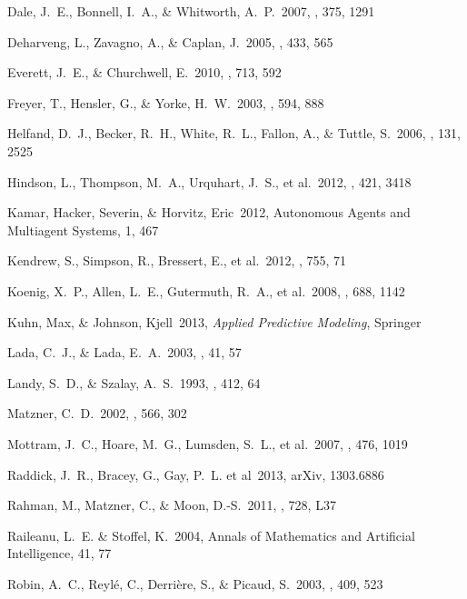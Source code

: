 \begin{thebibliography}{16}
 Dale, J.~E., Bonnell,
I.~A., \& Whitworth, A.~P.\ 2007, \mnras, 375, 1291

 Deharveng, L., Zavagno, A., \& Caplan, J.\ 2005, \aap, 433, 565

 Everett, J.~E., \& Churchwell, E.\ 2010, \apj, 713, 592

 Freyer, T., Hensler, G.,
\& Yorke, H.~W.\ 2003, \apj, 594, 888

 Helfand, D.~J., Becker,
R.~H., White, R.~L., Fallon, A., \& Tuttle, S.\ 2006, \aj, 131, 2525

 Hindson, L., Thompson,
M.~A., Urquhart, J.~S., et al.\ 2012, \mnras, 421, 3418

 Kamar, Hacker, Severin, \& Horvitz, Eric\ 2012, Autonomous Agents and Multiagent Systems, 1, 467

 Kendrew, S., Simpson,
R., Bressert, E., et al.\ 2012, \apj, 755, 71

 Koenig, X.~P., Allen,
L.~E., Gutermuth, R.~A., et al.\ 2008, \apj, 688, 1142

 Kuhn, Max, \& Johnson, Kjell\ 2013, \textit{Applied Predictive Modeling}, Springer

 Lada, C.~J., \& Lada, E.~A.\ 2003, \araa, 41, 57

 Landy, S.~D., \& Szalay, A.~S.\ 1993, \apj, 412, 64

 Matzner, C.~D.\ 2002, \apj,
566, 302

 Mottram, J.~C., Hoare, M.~G., Lumsden, S.~L., et al.\ 2007, \aap, 476, 1019

 Raddick, J.~R., Bracey, G., Gay, P.~L. et al\ 2013, arXiv, 1303.6886

 Rahman, M., Matzner, C.,
\& Moon, D.-S.\ 2011, \apjl, 728, L37

 Raileanu, L.~E. \& Stoffel, K.\ 2004, Annals of Mathematics and Artificial Intelligence, 41, 77

 Robin, A.~C., Reyl{\'e}, C., Derri{\`e}re, S., \& Picaud, S.\ 2003, \aap, 409, 523


\end{thebibliography}
